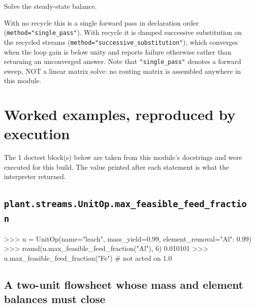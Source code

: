 \documentclass[10pt,a4paper,twoside]{report}
\begin{document}
Solve the steady-state balance.

With no recycle this is a single forward pass in declaration order (\texttt{method="single\_pass"}). With recycle it is damped successive substitution on the recycled streams (\texttt{method="successive\_substitution"}), which converges when the loop gain is below unity and reports failure otherwise rather than returning an unconverged answer. Note that \texttt{"single\_pass"} denotes a forward sweep, NOT a linear matrix solve: no routing matrix is assembled anywhere in this module.

\section{Worked examples, reproduced by execution}

The 1 doctest block(s) below are taken from this module's docstrings and were executed for this build. The value printed after each statement is what the interpreter returned.

\subsection*{\texttt{plant.streams.UnitOp.max\_feasible\_feed\_fraction}}

\begin{doctestblock}
>>> u = UnitOp(name="leach", mass_yield=0.99, element_removal={"Al": 0.99})
>>> round(u.max_feasible_feed_fraction("Al"), 6)
0.010101
>>> u.max_feasible_feed_fraction("Fe")   # not acted on
1.0
\end{doctestblock}

\subsection*{A two-unit flowsheet whose mass and element balances must close}
\end{document}
